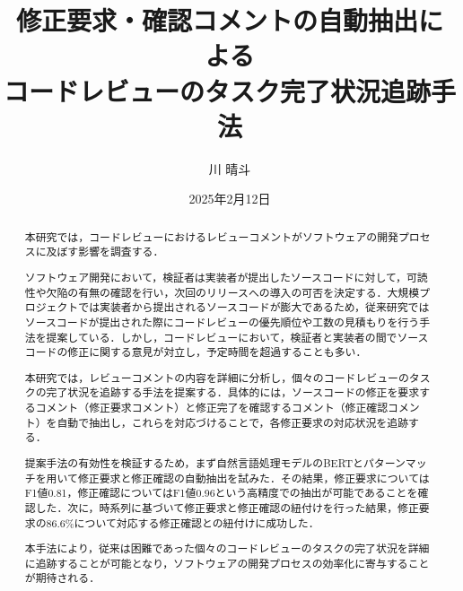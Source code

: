 \documentclass[11pt]{jreport}
\title{修正要求・確認コメントの自動抽出による\\
コードレビューのタスク完了状況追跡手法}
\author{川\UTF{FA11} 晴斗}
\date{2025年2月12日}
\newcommand{\todo}[1]{\colorbox{yellow}{{\bf TODO}:}{\color{red} {\textbf{[#1]}}}}
\begin{document}
\maketitle

\begin{abstract}
本研究では，コードレビューにおけるレビューコメントがソフトウェアの開発プロセスに及ぼす影響を調査する．

ソフトウェア開発において，検証者は実装者が提出したソースコードに対して，可読性や欠陥の有無の確認を行い，次回のリリースへの導入の可否を決定する．大規模プロジェクトでは実装者から提出されるソースコードが膨大であるため，従来研究ではソースコードが提出された際にコードレビューの優先順位や工数の見積もりを行う手法を提案している．しかし，コードレビューにおいて，検証者と実装者の間でソースコードの修正に関する意見が対立し，予定時間を超過することも多い．

本研究では，レビューコメントの内容を詳細に分析し，個々のコードレビューのタスクの完了状況を追跡する手法を提案する．具体的には，ソースコードの修正を要求するコメント（修正要求コメント）と修正完了を確認するコメント（修正確認コメント）を自動で抽出し，これらを対応づけることで，各修正要求の対応状況を追跡する．

提案手法の有効性を検証するため，まず自然言語処理モデルのBERTとパターンマッチを用いて修正要求と修正確認の自動抽出を試みた．その結果，修正要求についてはF1値0.81，修正確認についてはF1値0.96という高精度での抽出が可能であることを確認した．次に，時系列に基づいて修正要求と修正確認の紐付けを行った結果，修正要求の86.6\%について対応する修正確認との紐付けに成功した．

本手法により，従来は困難であった個々のコードレビューのタスクの完了状況を詳細に追跡することが可能となり，ソフトウェアの開発プロセスの効率化に寄与することが期待される．

\end{abstract}
\end{document}
